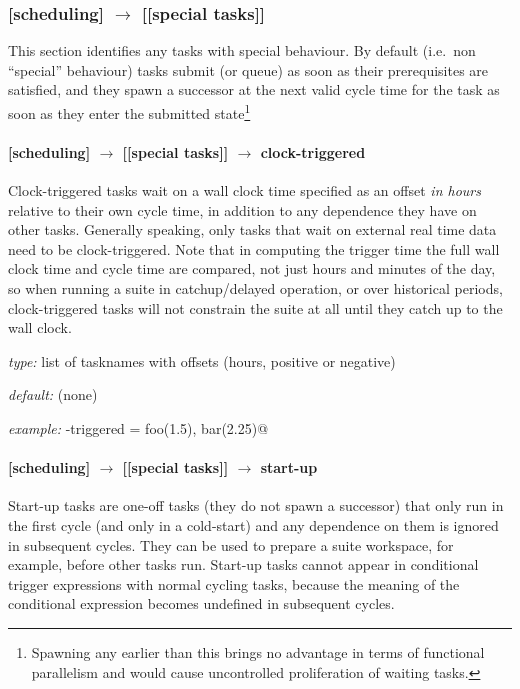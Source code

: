 \subsubsection[{[[}special tasks{]]}]{[scheduling] $\rightarrow$ [[special tasks]]}

This section identifies any tasks with special behaviour. By default
(i.e.\ non ``special'' behaviour) tasks submit (or queue) as soon as
their prerequisites are satisfied, and they spawn a successor at the
next valid cycle time for the task as soon as they enter the submitted 
state\footnote{Spawning any earlier than this brings no advantage in
terms of functional parallelism and would cause uncontrolled
proliferation of waiting tasks.}

\paragraph[clock-triggered]{[scheduling] $\rightarrow$ [[special tasks]] $\rightarrow$ clock-triggered}

Clock-triggered tasks wait on a wall clock time specified as an offset
{\em in hours} relative to their own cycle time, in addition to any
dependence they have on other tasks. Generally speaking, only tasks that
wait on external real time data need to be clock-triggered.  Note that
in computing the trigger time the full wall clock time and cycle time
are compared, not just hours and minutes of the day, so when running a
suite in catchup/delayed operation, or over historical periods,
clock-triggered tasks will not constrain the suite at all until they
catch up to the wall clock.

\begin{myitemize}
    \item {\em type:} list of tasknames with offsets (hours, positive or negative)
    \item {\em default:} (none)
    \item {\em example:} \lstinline@clock-triggered = foo(1.5), bar(2.25)@
\end{myitemize}

\paragraph[start-up]{[scheduling] $\rightarrow$ [[special tasks]] $\rightarrow$ start-up}

Start-up tasks are one-off tasks (they do not spawn a successor) that
only run in the first cycle (and only in a cold-start) and any
dependence on them is ignored in subsequent cycles. They can be used to
prepare a suite workspace, for example, before other tasks run. Start-up
tasks cannot appear in conditional trigger expressions with normal
cycling tasks, because the meaning of the conditional expression becomes
undefined in subsequent cycles. 


